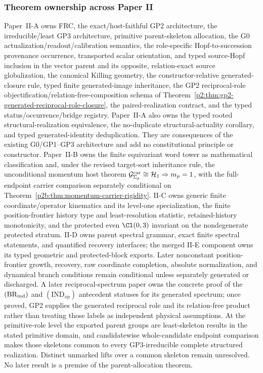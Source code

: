 \documentclass[12pt,a4paper]{article}
\begin{document}
\subsubsection{Theorem ownership across Paper II}
\label{p2:subsec:theorem-ownership}
Paper~II-A owns FRC, the exact/host-faithful GP2 architecture, the
irreducible/least GP3 architecture, primitive parent-skeleton allocation,
the G0 actualization/readout/calibration semantics,
the role-specific Hopf-to-succession provenance occurrence, transported
scalar orientation, and typed source-Hopf inclusion in the vector parent and
its opposite,
relation-exact source globalization, the canonical Killing geometry, the
constructor-relative generated-closure rule, typed finite generated-image
inheritance, the GP2 reciprocal-role objectification/relation-free-composition
schema of Theorem~\ref{p2:thm:gp2-generated-reciprocal-role-closure}, the
paired-realization contract, and the typed status/occurrence/bridge registry.
Paper~II-A also owns the typed rooted structural-realization equivalence, the
no-duplicate structural-actuality corollary, and typed generated-identity
deduplication.  They are consequences of the existing G0/GP1--GP3
architecture and add no constitutional principle or constructor.
Paper~II-B owns the finite equivariant word tower as mathematical
classification and, under the revised target-sort inheritance rule, the
unconditional momentum host theorem
\(\mathcal G^{\rm car}_{\Sigma_p}\cong\mathcal H_1
\Rightarrow m_p=1\), with the full-endpoint carrier comparison separately
conditional on Theorem~\ref{p2b:thm:momentum-carrier-rigidity}.
II-C owns generic finite
coordinate/operator kinematics and its level-one specialization, the finite
position-frontier history type and least-resolution statistic, retained-history
monotonicity, and the protected even \(\Cl(0,3)\) invariant on the
nondegenerate protected stratum.  II-D owns parent spectral grammar, exact
finite spectral statements, and quantified recovery interfaces; the merged
II-E component owns its typed geometric and protected-block exports.  Later
nonconstant position-frontier growth, recovery, raw coordinate completion,
absolute normalization, and dynamical branch conditions remain conditional
unless separately generated or discharged.  A later reciprocal-spectrum paper owns the concrete
proof of the \((\mathrm{BR}_{\rm ind})\) and \((\mathrm{IND}_{xp})\)
antecedent statuses for its generated spectrum; once proved, GP2 supplies the
generated reciprocal role and its relation-free product rather than treating
those labels as independent physical assumptions.  At the primitive-role level the exported parent groups
are least-skeleton results in the stated primitive domain, and candidatewise
whole-candidate endpoint comparison makes those skeletons common to every GP3-irreducible complete
structured realization.  Distinct unmarked lifts over a common skeleton remain
unresolved.  No later result is a premise of the parent-allocation theorem.
\end{document}
